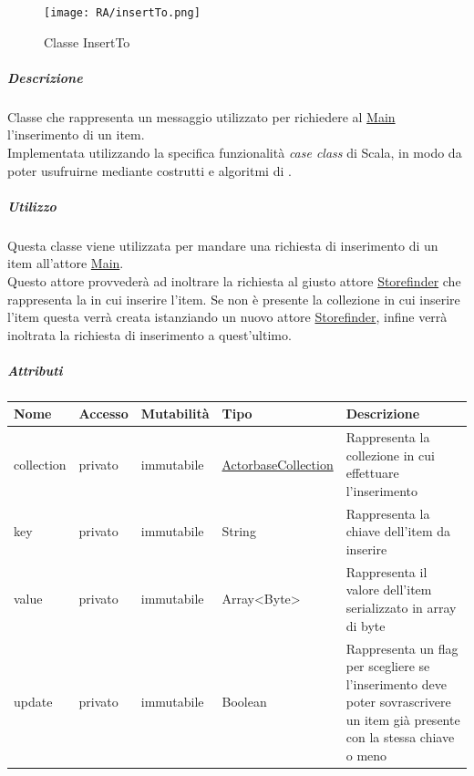 \documentclass{scalatekids-article}
\begin{document}
\begin{figure}[H]
  \begin{center}
    \texttt{[image: RA/insertTo.png]}
    \caption{Classe InsertTo}
  \end{center}
\end{figure}

\subparagraph{Descrizione}
Classe che rappresenta un messaggio utilizzato per richiedere al
\hyperref[sec:actorbase::actorsystem::actors::main::Main]{Main} l'inserimento
di un item.\\Implementata utilizzando la specifica funzionalità
\textit{case class} di Scala,
in modo da poter usufruirne mediante costrutti e algoritmi di
.

\subparagraph{Utilizzo}
Questa classe viene utilizzata per mandare una richiesta di inserimento di un
item all'attore
\hyperref[sec:actorbase::actorsystem::actors::main::Main]{Main}.\\Questo attore
provvederà ad inoltrare la richiesta al giusto attore
\hyperref[sec:actorbase::actorsystem::actors::storefinder::Storefinder]{Storefinder}
che rappresenta la  in cui inserire l'item. Se non è presente
la collezione in cui inserire l'item questa verrà creata istanziando un nuovo
attore
\hyperref[sec:actorbase::actorsystem::actors::storefinder::Storefinder]{Storefinder},
infine verrà inoltrata la richiesta di inserimento a quest'ultimo.

\subparagraph{Attributi}
\begin{tabular}{| p{2cm} | p{1.5cm} | p{2cm} | p{3cm} | p{8.5cm} |}
  \hline
  Nome & Accesso & Mutabilità & Tipo & Descrizione\\
  \hline
  collection & privato & immutabile & \hyperref[sec:actorbase::actorsystem::utils::ActorbaseCollection]{ActorbaseCollection} & Rappresenta la collezione in cui effettuare l'inserimento \\
  \hline
  key & privato & immutabile & String & Rappresenta la chiave dell'item da inserire\\
  \hline
  value & privato & immutabile & Array<Byte> & Rappresenta il valore dell'item serializzato in array di byte\\
  \hline
  update & privato & immutabile & Boolean & Rappresenta un flag per scegliere se l'inserimento deve poter sovrascrivere un item già presente con la stessa chiave o meno\\
  \hline
\end{tabular}
\end{document}
